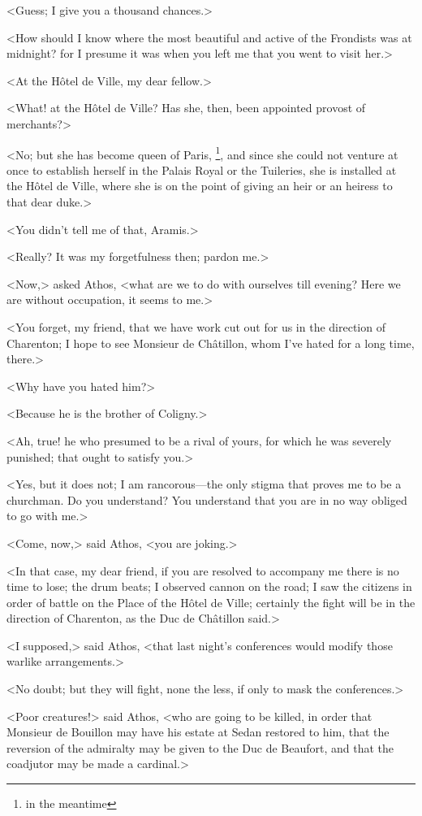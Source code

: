 <Guess; I give you a thousand chances.>

<How should I know where the most beautiful and active of the Frondists was at midnight? for I presume it was when you left me that you went to visit her.>

<At the Hôtel de Ville, my dear fellow.>

<What! at the Hôtel de Ville? Has she, then, been appointed provost of merchants?>

<No; but she has become queen of Paris, \footnote{in the meantime}, and since she could not venture at once to establish herself in the Palais Royal or the Tuileries, she is installed at the Hôtel de Ville, where she is on the point of giving an heir or an heiress to that dear duke.>

<You didn't tell me of that, Aramis.>

<Really? It was my forgetfulness then; pardon me.>

<Now,> asked Athos, <what are we to do with ourselves till evening? Here we are without occupation, it seems to me.>

<You forget, my friend, that we have work cut out for us in the direction of Charenton; I hope to see Monsieur de Châtillon, whom I've hated for a long time, there.>

<Why have you hated him?>

<Because he is the brother of Coligny.>

<Ah, true! he who presumed to be a rival of yours, for which he was severely punished; that ought to satisfy you.>

<Yes, but it does not; I am rancorous—the only stigma that proves me to be a churchman. Do you understand? You understand that you are in no way obliged to go with me.>

<Come, now,> said Athos, <you are joking.>

<In that case, my dear friend, if you are resolved to accompany me there is no time to lose; the drum beats; I observed cannon on the road; I saw the citizens in order of battle on the Place of the Hôtel de Ville; certainly the fight will be in the direction of Charenton, as the Duc de Châtillon said.>

<I supposed,> said Athos, <that last night's conferences would modify those warlike arrangements.>

<No doubt; but they will fight, none the less, if only to mask the conferences.>

<Poor creatures!> said Athos, <who are going to be killed, in order that Monsieur de Bouillon may have his estate at Sedan restored to him, that the reversion of the admiralty may be given to the Duc de Beaufort, and that the coadjutor may be made a cardinal.>

